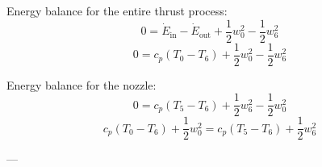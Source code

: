 Energy balance for the entire thrust process:  
\[ 0 = \dot{E}_{\text{in}} - \dot{E}_{\text{out}} + \frac{1}{2} w_0^2 - \frac{1}{2} w_6^2 \]  
\[ 0 = c_p (T_0 - T_6) + \frac{1}{2} w_0^2 - \frac{1}{2} w_6^2 \]  

Energy balance for the nozzle:  
\[ 0 = c_p (T_5 - T_6) + \frac{1}{2} w_6^2 - \frac{1}{2} w_0^2 \]  
\[ c_p (T_0 - T_6) + \frac{1}{2} w_0^2 = c_p (T_5 - T_6) + \frac{1}{2} w_6^2 \]  

---